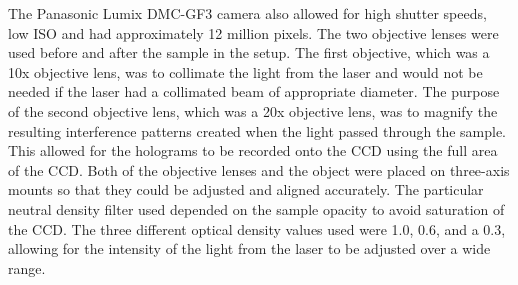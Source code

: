 The Panasonic Lumix DMC-GF3 camera also allowed for high shutter speeds, low ISO
and had approximately 12 million pixels.
The two objective lenses were used
before and after the sample in the setup. The first objective, which was a 10x
objective lens, was to %
collimate the light from the laser and would not be needed if the laser
had a collimated beam of appropriate diameter. The purpose of the second
objective lens, which was a 20x
objective lens, was to
magnify the resulting interference patterns created
when the light passed through the sample. This allowed for the holograms to be
recorded onto the CCD using the full area of the CCD.
Both of the objective lenses and the object were placed on
three-axis mounts so that they could be adjusted and aligned accurately.
The particular neutral density filter used depended on the sample opacity to avoid
saturation of the CCD.
The three different optical density values used were 1.0, 0.6,
and a 0.3, allowing for the intensity of the light from the laser to be
adjusted over a wide range.


%

